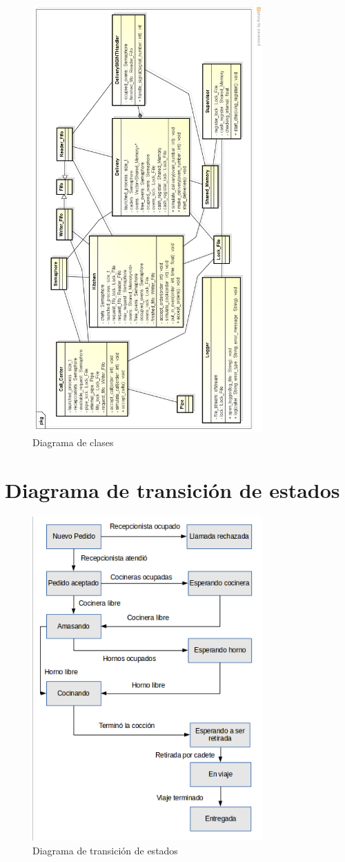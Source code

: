 \documentclass[11pt,spanish,a4paper,openany,notitlepage]{article}
\begin{document}
\begin{figure}[h]
\begin{center}
\includegraphics[width=250pt]{./informe/diagrama-clases.png}
\caption{Diagrama de clases}
\end{center}
\end{figure}

\newpage

\section{Diagrama de transición de estados}

\begin{figure}[h]
\begin{center}
\includegraphics[width=250pt]{./informe/diagrama-estados-pizza.png}
\caption{Diagrama de transición de estados}
\end{center}
\end{figure}
\end{document}
